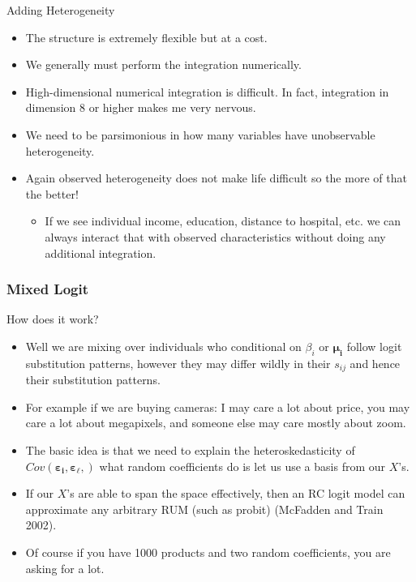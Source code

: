 \begin{frame}{Adding Heterogeneity}
\begin{itemize}
\item The structure is extremely flexible but at a cost.
\item We generally must perform the integration numerically.
\item High-dimensional numerical integration is difficult. In fact, integration in dimension 8 or higher makes me very nervous.
\item We need to be parsimonious in how many variables have unobservable heterogeneity.
\item Again observed heterogeneity does not make life difficult so the more of that the better!
\begin{itemize}
\item If we see individual income, education, distance to hospital, etc. we can always interact that with observed characteristics without doing any additional integration.
\end{itemize}
\end{itemize}
\end{frame}


\begin{frame}
\frametitle{Mixed Logit}
How does it work?
 \begin{itemize}
\item Well we are mixing over individuals who conditional on $\beta_i$ or $\boldsymbol{\mu_i}$ follow logit substitution patterns, however they may differ wildly in their $s_{ij}$ and hence their substitution patterns.
\item For example if we are buying cameras: I may care a lot about price, you may care a lot about megapixels, and someone else may care mostly about zoom.
\item The basic idea is that we need to explain the heteroskedasticity of $Cov(\boldsymbol{\varepsilon_i}, \boldsymbol{\varepsilon_{\ell}},)$ what random coefficients do is let us use a basis from our $X$'s.
\item If our $X$'s are able to span the space effectively, then an RC logit model can approximate any arbitrary RUM (such as probit) (McFadden and Train 2002). 
\item Of course if you have 1000 products and two random coefficients, you are asking for a lot.
 \end{itemize}
\end{frame}

